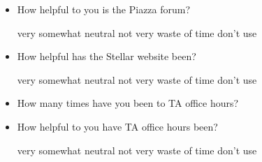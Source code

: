 \documentclass[handout]{mcs}
\begin{document}
\begin{itemize}
\begin{itemize}
\item How helpful to you is the Piazza forum?

\begin{center}
very\hspace{0.3in} somewhat \hspace{0.3in} neutral\hspace{0.3in} not
very \hspace{0.3in} waste of time  \hspace{0.7in}don't use
\end{center}


\item How helpful has the Stellar website been?

\begin{center}
very\hspace{0.3in} somewhat \hspace{0.3in} neutral\hspace{0.3in} not
very \hspace{0.3in} waste of time  \hspace{0.7in}don't use
\end{center}

\iffalse
\item How helpful has the class website been?

\begin{center}
very\hspace{0.3in} somewhat \hspace{0.3in} neutral\hspace{0.3in} not
very \hspace{0.3in} waste of time  \hspace{0.7in}don't use
\end{center}
\fi

\item How many times have you been to TA office hours?\brule{0.7in}

\item How helpful to you have TA office hours been?
 
\begin{center}
very\hspace{0.3in} somewhat \hspace{0.3in} neutral\hspace{0.3in} not
very \hspace{0.3in} waste of time  \hspace{0.7in}don't use
\end{center}

\end{itemize}


\end{itemize}
\end{document}
